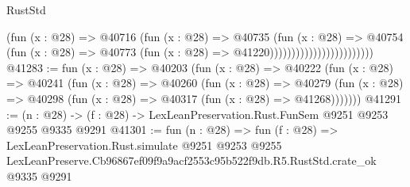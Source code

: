 \begin{lexlean}{RustStd}
\begin{coremodule}
                                          (fun (x : @28) =>
                                          @40716
                                            (fun (x : @28) =>
                                            @40735
                                              (fun (x : @28) =>
                                              @40754
                                                (fun (x : @28) =>
                                                @40773
                                                  (fun (x : @28) => @41220))))))))))))))))))))))))
@41283 := fun (x : @28) =>
  @40203
    (fun (x : @28) =>
    @40222
      (fun (x : @28) =>
      @40241
        (fun (x : @28) =>
        @40260
          (fun (x : @28) =>
          @40279 (fun (x : @28) => @40298 (fun (x : @28) => @40317 (fun (x : @28) => @41268)))))))
@41291 := (n : @28) -> (f : @28) -> LexLeanPreservation.Rust.FunSem @9251 @9253 @9255 @9335 @9291
@41301 := fun (n : @28) =>
  fun (f : @28) =>
  LexLeanPreservation.Rust.simulate
    @9251
    @9253
    @9255
    LexLeanPreserve.Cb96867ef09f9a9acf2553c95b522f9db.R5.RustStd.crate_ok
    @9335
    @9291
\end{coremodule}
\end{lexlean}
